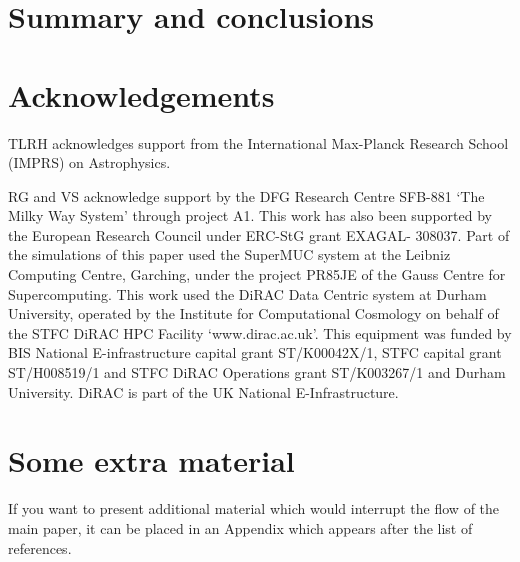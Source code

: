 \documentclass[a4paper,fleqn,usenatbib]{mnras}
\begin{document}
\section{Summary and conclusions}
\label{sec:conclusions}


\section*{Acknowledgements}
TLRH acknowledges support from the International Max-Planck Research School (IMPRS) on Astrophysics.

RG and VS acknowledge support by the DFG Research Centre SFB-881 `The
Milky Way System' through project A1. This work has also been
supported by the European Research Council under ERC-StG grant
EXAGAL- 308037. Part of the simulations of this paper used the
SuperMUC system at the Leibniz Computing Centre, Garching,
under the project PR85JE of the Gauss Centre for Supercomputing.
This work used the DiRAC Data Centric system at Durham
University, operated by the Institute for Computational Cosmology
on behalf of the STFC DiRAC HPC Facility `www.dirac.ac.uk'.
This equipment was funded by BIS National E-infrastructure capital 
grant ST/K00042X/1, STFC capital grant ST/H008519/1 and
STFC DiRAC Operations grant ST/K003267/1 and Durham University. 
DiRAC is part of the UK National E-Infrastructure.










\appendix

\section{Some extra material}

If you want to present additional material which would interrupt the flow of the main paper,
it can be placed in an Appendix which appears after the list of references.



\bsp    %
\label{lastpage}
\end{document}
